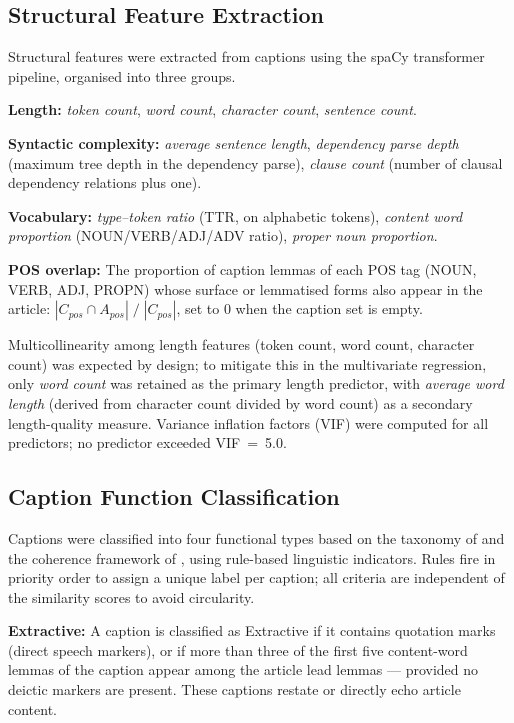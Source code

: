 \documentclass[11pt,a4paper]{article}
\begin{document}
\subsection{Structural Feature Extraction}

Structural features were extracted from captions using the spaCy
transformer pipeline, organised into three groups.

\textbf{Length:} \textit{token count}, \textit{word count},
\textit{character count}, \textit{sentence count}.

\textbf{Syntactic complexity:} \textit{average sentence length},
\textit{dependency parse depth} (maximum tree depth in the dependency
parse), \textit{clause count} (number of clausal dependency relations
plus one).

\textbf{Vocabulary:} \textit{type--token ratio} (TTR, on alphabetic
tokens), \textit{content word proportion} (NOUN/VERB/ADJ/ADV ratio),
\textit{proper noun proportion}.

\textbf{POS overlap:} The proportion of caption lemmas of each POS tag
(NOUN, VERB, ADJ, PROPN) whose surface or lemmatised forms also appear in
the article: $|C_{pos} \cap A_{pos}|\;/\;|C_{pos}|$, set to 0 when the
caption set is empty.

Multicollinearity among length features (token count, word count, character
count) was expected by design; to mitigate this in the multivariate
regression, only \textit{word count} was retained as the primary length
predictor, with \textit{average word length} (derived from character count
divided by word count) as a secondary length-quality measure. Variance
inflation factors (VIF) were computed for all predictors; no predictor
exceeded VIF~=~5.0.

\subsection{Caption Function Classification}

Captions were classified into four functional types based on the
taxonomy of \citet{marsh2003taxonomy} and the coherence framework of
\citet{Alikhani2023ImageTextCoherence}, using rule-based linguistic
indicators. Rules fire in priority order to assign a unique label per
caption; all criteria are independent of the similarity scores to avoid
circularity.

\textbf{Extractive:} A caption is classified as Extractive if it contains
quotation marks (direct speech markers), or if more than three of the
first five content-word lemmas of the caption appear among the article
lead lemmas --- provided no deictic markers are present. These captions
restate or directly echo article content.
\end{document}
